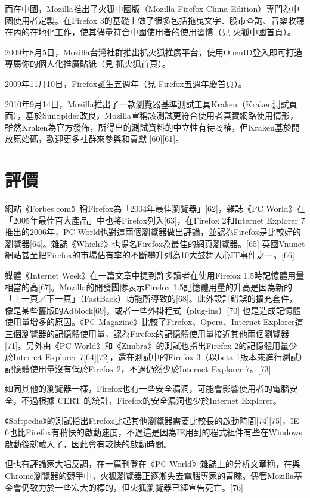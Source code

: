 \documentclass[12pt]{article}
\begin{document}
而在中國，Mozilla推出了火狐中國版（Mozilla Firefox China Edition）專門為中國使用者定製。在Firefox 3的基礎上做了很多包括拖曳文字、股市查詢、音樂收聽在內的在地化工作，使其儘量符合中國使用者的使用習慣（見 火狐中國首頁）。

2009年8月5日，Mozilla台灣社群推出抓火狐推廣平台，使用OpenID登入即可打造專屬你的個人化推廣貼紙（見 抓火狐首頁）。

2009年11月10日，Firefox誕生五週年（見 Firefox五週年慶首頁）。

2010年9月14日，Mozilla推出了一款瀏覽器基準測試工具Kraken（Kraken測試頁面），基於SunSpider改良，Mozilla宣稱該測試更符合使用者真實網路使用情形，雖然Kraken為官方發佈，所得出的測試資料的中立性有待商榷，但Kraken基於開放原始碼，歡迎更多社群來參與和貢獻 [60][61]。

\section{評價}

網站《Forbes.com》稱Firefox為「2004年最佳瀏覽器」[62]，雜誌《PC World》在「2005年最佳百大產品」中也將Firefox列入[63]，在Firefox 2和Internet Explorer 7推出的2006年，PC World也對這兩個瀏覽器做出評論，並認為Firefox是比較好的瀏覽器[64]。雜誌《Which?》也提名Firefox為最佳的網頁瀏覽器。[65] 英國Vnunet網站甚至把Firefox的市場佔有率的不斷攀升列為10大鼓舞人心IT事件之一。[66]

媒體《Internet Week》在一篇文章中提到許多讀者在使用Firefox 1.5時記憶體用量相當的高[67]。Mozilla的開發團隊表示Firefox 1.5記憶體用量的升高是因為新的「上一頁／下一頁」（FastBack）功能所導致的[68]。此外設計錯誤的擴充套件，像是某些舊版的Adblock[69]，或者一些外掛程式（plug-ins）[70] 也是造成記憶體使用量增多的原因。《PC Magazine》比較了Firefox、Opera、Internet Explorer這三個瀏覽器的記憶體使用量，認為Firefox的記憶體使用量接近其他兩個瀏覽器[71]。另外由《PC World》和《Zimbra》的測試也指出Firefox 2的記憶體用量少於Internet Explorer 7[64][72]，還在測試中的Firefox 3（以beta 1版本來進行測試）記憶體使用量沒有低於Firefox 2，不過仍然少於Internet Explorer 7。[73]

如同其他的瀏覽器一樣，Firefox也有一些安全漏洞，可能會影響使用者的電腦安全，不過根據 CERT 的統計，Firefox的安全漏洞也少於Internet Explorer。

《Softpedia》的測試指出Firefox比起其他瀏覽器需要比較長的啟動時間[74][75]，IE 6也比Firefox有稍快的啟動速度，不過這是因為IE用到的程式組件有些在Windows啟動後就載入了，因此會有較快的啟動時間。

但也有評論家大唱反調，在一篇刊登在《PC World》雜誌上的分析文章稱，在與Chrome瀏覽器的競爭中，火狐瀏覽器正逐漸失去電腦專家的青睞。儘管Mozilla基金會仍致力於一些宏大的標的，但火狐瀏覽器已經宣告死亡。[76]
\end{document}
